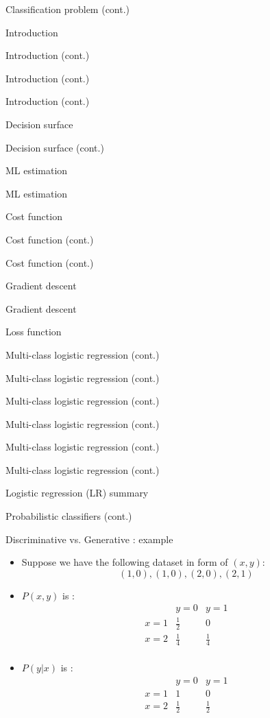 \documentclass[serif, aspectratio=169]{beamer}
\begin{document}
\begin{frame}{Classification problem (cont.)}
\begin{itemize}
\begin{frame}{Introduction}
\begin{itemize}
\begin{frame}{Introduction (cont.)}
\begin{frame}{Introduction (cont.)}
\begin{frame}{Introduction (cont.)}
\begin{frame}{Decision surface}
\begin{itemize}
\begin{frame}{Decision surface (cont.)}
\begin{frame}{ML estimation}
\begin{frame}{ML estimation}
\begin{itemize}
\begin{frame}{Cost function}
\begin{frame}{Cost function (cont.)}
\begin{itemize}
\begin{itemize}
\begin{frame}{Cost function (cont.)}
\begin{frame}{Gradient descent}
\begin{frame}{Gradient descent}
\begin{frame}{Loss function}
\begin{frame}{Multi-class logistic regression (cont.)}
\begin{frame}{Multi-class logistic regression (cont.)}
\begin{frame}{Multi-class logistic regression (cont.)}
\begin{frame}{Multi-class logistic regression (cont.)}
\begin{frame}{Multi-class logistic regression (cont.)}
\begin{frame}{Multi-class logistic regression (cont.)}
\begin{frame}{Logistic regression (LR) summary}
\begin{itemize}
\begin{frame}{Probabilistic classifiers (cont.)}
\begin{itemize}
    \end{itemize}
\end{frame}

\begin{frame}{Discriminative vs. Generative : example}
    \begin{itemize}
        \item Suppose we have the following dataset in form of $(x, y)$:
            \[
                (1,0), (1,0), (2,0), (2,1)
            \]
        \item $P(x,y)$ is :
            \[
            \begin{array}{c|cc}
                & y=0 & y=1 \\
                \hline
            x=1 & \frac{1}{2} & 0 \\
            x=2 & \frac{1}{4} & \frac{1}{4} \\
            \end{array}
            \]
        \item $P(y|x)$ is :
            \[
            \begin{array}{c|cc}
                & y=0 & y=1 \\
                \hline
            x=1 & 1 & 0 \\
            x=2 & \frac{1}{2} & \frac{1}{2} \\
            \end{array}
            \]
    \end{itemize}
\end{frame}



\end{itemize}
\end{frame}
\end{frame}
\end{frame}
\end{frame}
\end{frame}
\end{frame}
\end{frame}
\end{frame}
\end{frame}
\end{frame}
\end{frame}
\end{itemize}
\end{itemize}
\end{frame}
\end{frame}
\end{itemize}
\end{frame}
\end{frame}
\end{frame}
\end{itemize}
\end{frame}
\end{frame}
\end{frame}
\end{frame}
\end{itemize}
\end{frame}
\end{itemize}
\end{frame}
\end{document}
